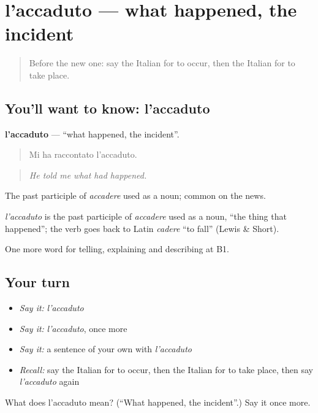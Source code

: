 \section[l'accaduto]{l'accaduto — what happened, the incident}

\label{lesson:IT-C275-accaduto}



\begin{quote}
Before the new one: say the Italian for to occur, then the Italian for to take place.
\end{quote}

\subsection*{You'll want to know: l'accaduto}
\textbf{l'accaduto} — \textquotedblleft{}what happened, the incident\textquotedblright{}.

\begin{quote}
Mi ha raccontato l'accaduto.
\end{quote}

\begin{quote}
\emph{He told me what had happened.}
\end{quote}

The past participle of \emph{accadere} used as a noun; common on the news.

\begin{cousinweb}
\emph{l'accaduto} is the past participle of \emph{accadere} used as a noun, \textquotedblleft{}the thing that happened\textquotedblright{}; the verb goes back to Latin \emph{cadere} \textquotedblleft{}to fall\textquotedblright{} (Lewis \& Short).
\end{cousinweb}

\begin{grammarlens}[title={What you've built}]
One more word for telling, explaining and describing at B1.
\end{grammarlens}

\subsection*{Your turn}
\begin{itemize}
\raggedright
  \item \emph{Say it:} \emph{l'accaduto}
  \item \emph{Say it:} \emph{l'accaduto}, once more
  \item \emph{Say it:} a sentence of your own with \emph{l'accaduto}
  \item \emph{Recall:} say the Italian for to occur, then the Italian for to take place, then say \emph{l'accaduto} again
\end{itemize}

\begin{tcolorbox}[breakable,colback=teal!4,colframe=teal!35!black,title={Before you move on}]
What does l'accaduto mean? (\textquotedblleft{}What happened, the incident\textquotedblright{}.) Say it once more.
\end{tcolorbox}
